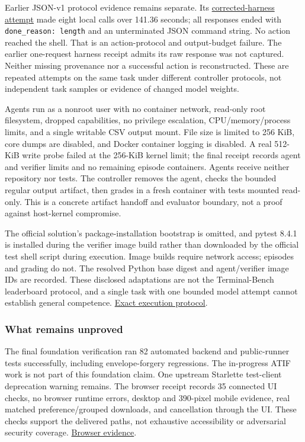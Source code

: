 \documentclass[
  11pt,
  letterpaper,
]{article}
\begin{document}
Earlier JSON-v1 protocol evidence remains separate. Its
\href{../../artifacts/public-benchmark/attempts/corrected-harness-second-attempt/report.json}{corrected-harness
attempt} made eight local calls over 141.36 seconds; all responses ended
with \texttt{done\_reason:\ length} and an unterminated JSON command
string. No action reached the shell. That is an action-protocol and
output-budget failure. The earlier one-request harness receipt admits
its raw response was not captured. Neither missing provenance nor a
successful action is reconstructed. These are repeated attempts on the
same task under different controller protocols, not independent task
samples or evidence of changed model weights.

Agents run as a nonroot user with no container network, read-only root
filesystem, dropped capabilities, no privilege escalation,
CPU/memory/process limits, and a single writable CSV output mount. File
size is limited to 256 KiB, core dumps are disabled, and Docker
container logging is disabled. A real 512-KiB write probe failed at the
256-KiB kernel limit; the final receipt records agent and verifier
limits and no remaining episode containers. Agents receive neither
repository nor tests. The controller removes the agent, checks the
bounded regular output artifact, then grades in a fresh container with
tests mounted read-only. This is a concrete artifact handoff and
evaluator boundary, not a proof against host-kernel compromise.

The official solution's package-installation bootstrap is omitted, and
pytest 8.4.1 is installed during the verifier image build rather than
downloaded by the official test shell script during execution. Image
builds require network access; episodes and grading do not. The resolved
Python base digest and agent/verifier image IDs are recorded. These
disclosed adaptations are not the Terminal-Bench leaderboard protocol,
and a single task with one bounded model attempt cannot establish
general competence. \href{../public-benchmark.md}{Exact execution
protocol}.

\subsubsection{What remains unproved}\label{what-remains-unproved}

The final foundation verification ran 82 automated backend and
public-runner tests successfully, including envelope-forgery
regressions. The in-progress ATIF work is not part of this foundation
claim. One upstream Starlette test-client deprecation warning remains.
The browser receipt records 35 connected UI checks, no browser runtime
errors, desktop and 390-pixel mobile evidence, real matched
preference/grouped downloads, and cancellation through the UI. These
checks support the delivered paths, not exhaustive accessibility or
adversarial security coverage.
\href{../../artifacts/qa/ui-report.json}{Browser evidence}.
\end{document}
